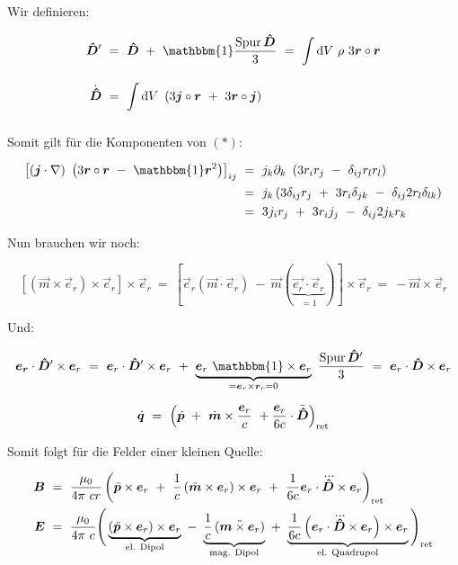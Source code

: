 Wir definieren:

\begin{align*}
\tens{D}'  \ &= \ \tens{D} \ + \ \mathbbm{1}\frac{\operatorname{Spur} \tens{D}}{3}  \ = \  \Int{}{}{V}\rho \ 3 \vec{r}\circ\vec{r}\\
\dot{\tens{D}} \ &= \ \Int{}{}{V}\left(3\vec{j}\circ\vec{r} \ + \ 3 \vec{r}\circ\vec{j}\right)
\end{align*}


Somit gilt für die Komponenten von $(*)$:

\begin{align*}
\left[\left(\vec{j}\cdot\nabla\right) \ \left(3\vec{r}\circ\vec{r} \ - \ \mathbbm{1} \vec{r}^2\right)\right]_{ij}  \ &= \ j_k \partial_k\ \left(3 r_i r_j \ - \ \delta_{ij} r_l r_l\right)\\
&= \ j_k \left(3\delta_{ij}r_j \ + \ 3r_i\delta_{jk} \ - \ \delta_{ij} 2 r_l \delta_{lk}\right)\\
&= \ 3j_i r_j \ + \ 3 r_i j_j \ - \ \delta_{ij} 2 j_k r_k
\end{align*}

Nun brauchen wir noch:

\begin{equation*}
\left[\left(\vec{m}\times\vec{e}_r\right)\times\vec{e}_r\right]\times\vec{e}_r  \ = \ \left[\vec{e}_r(\vec{m}\cdot\vec{e}_r) \ - \ \vec{m}(\underbrace{\vec{e_r}\cdot\vec{e}_r}_{=1})\right] \times \vec{e}_r \ = \ - \vec{m}\times\vec{e}_r
\end{equation*}

Und:

\begin{equation*}
\vec{e_r}\cdot\tens{D}'\times\vec{e}_r  \ = \ \vec{e}_r \cdot\tens{D}'\times\vec{e}_r \ + \ \underbrace{\vec{e}_r \ \mathbbm{1} \times\vec{e}_r}_{=\vec{e}_r\times\vec{r}_r =0} \ \frac{\operatorname{Spur}\tens{D}'}{3}  \ = \ \vec{e}_r\cdot\tens{D}\times\vec{e}_r
\end{equation*}

\begin{equation*}
\dot{\bm{q}}  \ = \  \left(\dot{\bm{p}} \ + \ \dot{\bm{m}} \times\frac{\bm{e}_r}{c} \ + \frac{\bm{e}_r}{6c}\cdot \ddot{\bm{\hat{
		D}}}\right)_{\text{ret}}
\end{equation*}

Somit folgt für die Felder einer kleinen Quelle:

\begin{align*}
\vec{B}  \ &= \ \frac{\mu_0}{4\pi \ c r} \left(\ddot{\vec{p}}\times\vec{e}_r \ + \ \frac{1}{c} \left(\ddot{\vec{m}}\times
\vec{e}_r\right) \times\vec{e}_r \ + \ \frac{1}{6c}\vec{e}_r\cdot\dddot{\tens{D}} \times\vec{e}_r\right)_{\text{ret}}\\
\vec{E}  \ &= \ \frac{\mu_0}{4\pi \ c} \Bigg(\underbrace{\left(\ddot{\vec{p}}\times\vec{e}_r\right)\times\vec{e}_r}_{\text{el. Dipol}} \ - \ \underbrace{\frac{1}{c}\left(\ddot{\vec{m}\times\vec{e}_r}\right)}_{\text{mag. Dipol}} \ + \ \underbrace{\frac{1}{6c}\left(\vec{e}_r\cdot\dddot{\tens{D}}\times\vec{e}_r\right)\times\vec{e}_r}_{\text{el. Quadrupol}}\Bigg)_{\text{ret}}
\end{align*}


